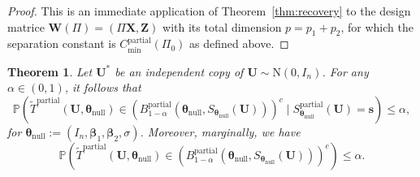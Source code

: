 \documentclass[11pt, reqno]{amsart}
\newcommand{\bP}{\mathbb{P}}
\renewcommand{\tilde}{\widetilde}
\renewcommand{\le}{\leqslant}
\newcommand{\1}{\mbox{1}\hspace{-0.25em}\mbox{l}}
\newcommand{\Normal}{\mathrm{N}}
\theoremstyle{definition}\newtheorem{problem}{Problem}[section]
\theoremstyle{definition}\newtheorem{definition}[problem]{Definition}
\theoremstyle{remark}\newtheorem{assumption}{Assumption}
\theoremstyle{remark}\newtheorem{remark}[problem]{Remark}
\theoremstyle{definition}\newtheorem{example}[problem]{Example}
\theoremstyle{plain}\newtheorem{theorem}[problem]{Theorem}
\theoremstyle{plain}\newtheorem{question}[problem]{Question}
\theoremstyle{plain}\newtheorem{lemma}[problem]{Lemma}
\theoremstyle{plain}\newtheorem{proposition}[problem]{Proposition}
\theoremstyle{plain}\newtheorem{corollary}[problem]{Corollary}
\theoremstyle{plain}\newtheorem{conjecture}[problem]{Conjecture}
\begin{document}
\begin{proof}
This is an immediate application of Theorem~\ref{thm:recovery} to the design matrice
$\bm{W}(\Pi) = (\Pi \bm{X}, \bm{Z})$ with its total dimension $p=p_1+p_2$, for which the separation constant is
$C_{\min}^{\mathrm{partial}}(\Pi_0)$ as defined above.
\end{proof}


\begin{theorem}\label{thm:p-value partial}
    Let $\bm{U}^*$ be an independent copy of $\bm{U} \sim \Normal(0,I_n)$. For any $\alpha \in (0,1)$, it follows that
\begin{equation}
    \bP \left(\tilde{T}^{\mathrm{partial}}(\bm{U}, \bm{\theta}_{\mathrm{null}}) \in  \left( B_{1-\alpha}^{\mathrm{partial}}(\bm{\theta}_{\mathrm{null}}, S_{\bm{\theta}_{\mathrm{null}}}(\bm{U})) \right)^c \mid S_{\bm{\theta}_{\mathrm{null}}}^{\mathrm{partial}}(\bm{U}) = \bm{s} \right)  \le \alpha,
\end{equation}
for $\bm{\theta}_{\mathrm{null}} := (I_n, \bm{\beta}_1, \bm{\beta}_2, \sigma)$. Moreover, marginally, we have
\begin{equation}\label{eq:marginal validity}
\bP \left(\tilde{T}^{\mathrm{partial}}(\bm{U}, \bm{\theta}_{\mathrm{null}}) \in  \left( B_{1-\alpha}^{\mathrm{partial}}(\bm{\theta}_{\mathrm{null}}, S_{\bm{\theta}_{\mathrm{null}}}(\bm{U})) \right)^c\right)  \le \alpha.
\end{equation}
\end{theorem}
\end{document}

